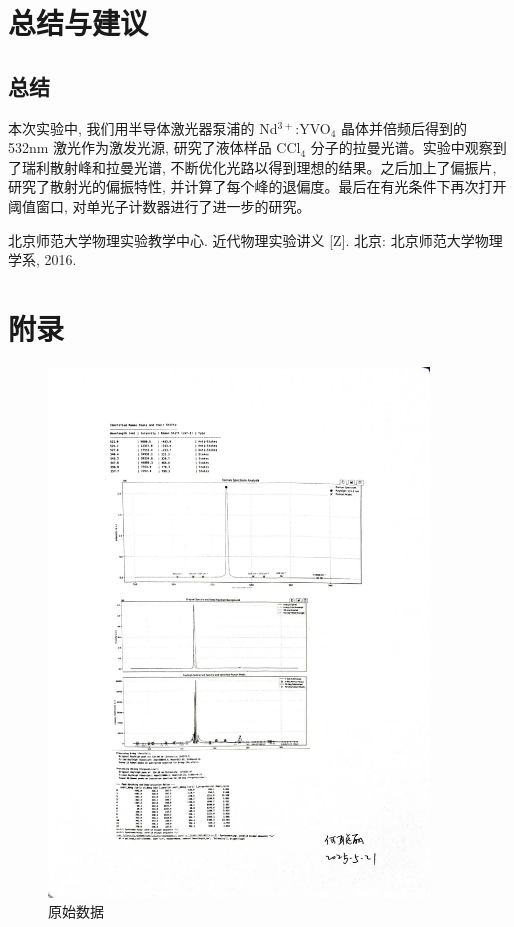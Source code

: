 \documentclass{article}
\begin{document}
\section{总结与建议}

\subsection{总结}

本次实验中, 我们用半导体激光器泵浦的 Nd$^{3+}$:YVO$_{4}$ 晶体并倍频后得到的 532nm 激光作为激发光源, 研究了液体样品 CCl$_{4}$ 分子的拉曼光谱。实验中观察到了瑞利散射峰和拉曼光谱, 不断优化光路以得到理想的结果。之后加上了偏振片, 研究了散射光的偏振特性, 并计算了每个峰的退偏度。最后在有光条件下再次打开阈值窗口, 对单光子计数器进行了进一步的研究。


\begin{thebibliography}{9}
 北京师范大学物理实验教学中心. 近代物理实验讲义 [Z]. 北京: 北京师范大学物理学系, 2016.
\end{thebibliography}

\newpage
\section*{附录}
\begin{figure}[H]
    \centering
    \includegraphics[width=0.9\textwidth]{data.jpg} %
    \caption{原始数据}
    \label{fig:appendix_setup}
\end{figure}
\end{document}
